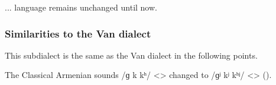 \begin{adjarianpage}\label{page:146}\end{adjarianpage}%

... language remains unchanged until now. 


\subsubsection{Similarities to the Van dialect}
This subdialect is the same as the Van dialect in the following points. 






The Classical Armenian sounds /ɡ k kʰ/ <> changed to /ɡʲ kʲ kʰʲ/ <> (). 

